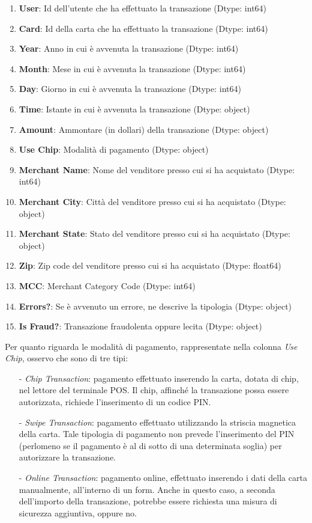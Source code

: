 \documentclass[]{article}
\begin{document}
        \begin{enumerate}[label=\roman*.]
            \item \textbf{User}: Id dell'utente che ha effettuato la transazione (Dtype: int64)
            \item \textbf{Card}: Id della carta che ha effettuato la transazione (Dtype: int64)
            \item \textbf{Year}: Anno in cui è avvenuta la transazione (Dtype: int64)
            \item \textbf{Month}: Mese in cui è avvenuta la transazione (Dtype: int64)
            \item \textbf{Day}: Giorno in cui è avvenuta la transazione (Dtype: int64)
            \item \textbf{Time}: Istante in cui è avvenuta la transazione (Dtype: object)
            \item \textbf{Amount}: Ammontare (in dollari) della transazione (Dtype: object)
            \item \textbf{Use Chip}: Modalità di pagamento (Dtype: object)
            \item \textbf{Merchant Name}: Nome del venditore presso cui si ha acquistato (Dtype: int64)
            \item \textbf{Merchant City}: Città del venditore presso cui si ha acquistato (Dtype: object)
            \item \textbf{Merchant State}: Stato del venditore presso cui si ha acquistato (Dtype: object)
            \item \textbf{Zip}: Zip code del venditore presso cui si ha acquistato (Dtype: float64)
            \item \textbf{MCC}: Merchant Category Code (Dtype: int64)
            \item \textbf{Errors?}: Se è avvenuto un errore, ne descrive la tipologia (Dtype: object)
            \item \textbf{Is Fraud?}: Transazione fraudolenta oppure lecita (Dtype: object)
        \end{enumerate}
        Per quanto riguarda le modalità di pagamento, rappresentate nella colonna \textit{Use Chip}, osservo che sono di tre tipi:
        \begin{itemize}
            \item [-] \textit{Chip Transaction}: pagamento effettuato inserendo la carta, dotata di chip, nel lettore del terminale POS. Il chip, affinché la transazione possa essere autorizzata, richiede l'inserimento di un codice PIN.
            \item [-] \textit{Swipe Transaction}: pagamento effettuato utilizzando la striscia magnetica della carta. Tale tipologia di pagamento non prevede l'inserimento del PIN (perlomeno se il pagamento è al di sotto di una determinata soglia) per autorizzare la transazione.
            \item [-] \textit{Online Transaction}: pagamento online, effettuato inserendo i dati della carta manualmente, all'interno di un form. Anche in questo caso, a seconda dell'importo della transazione, potrebbe essere richiesta una misura di sicurezza aggiuntiva, oppure no.
        \end{itemize}
\end{document}
